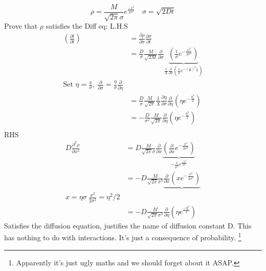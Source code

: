 \documentclass[11pt]{book}
\theoremstyle{definition}
\begin{document}
\[ \rho = \frac{M}{\sqrt{2\pi} \sigma} e^{\frac{-x^2}{2\sigma^2}} \quad \sigma = \sqrt{2Dt} \]
Prove that $ \rho $ satisfies the Diff eq: L.H.S
\[
\begin{aligned}	
	\left( \frac{\partial t}{\partial t} \right) &= \frac{\partial \rho}{\partial \sigma} \frac{\partial \sigma}{\partial t} \\
	&= \frac{D}{\sigma} \frac{M}{\sqrt{2M}}\frac{\partial }{\partial \sigma}
	\underbrace{\left( \frac{1}{\sigma} e^{-\frac{x^2}{2\sigma^2}} \right)}_{\frac{1}{X}\frac{\partial }{\partial \sigma} \left( \frac{x}{\sigma} e^{-(\frac{x}{\sigma})^2 \frac{1}{2}} \right) } \\
	\text{Set } \eta = \frac{x}{\sigma}, \: \frac{\partial }{\partial \sigma} = \frac{\eta}{\sigma} \frac{\partial }{\partial \eta} \\
	&= \frac{D}{\sigma} \frac{M}{\sqrt{2\pi}} \frac{1}{X} \frac{\partial \eta}{\partial \sigma} \frac{\partial }{\partial \eta} \left( \eta e^{-\frac{\eta^2}{2}} \right) \\
	&= -\frac{D}{\sigma^2} \frac{M}{\sqrt{2\pi}}\frac{\partial }{\partial \eta} \left( \eta e^{-\frac{\eta^2}{2}} \right) \\
\end{aligned}
\]
RHS
\[ 
\begin{aligned}
	D \frac{\partial ^2\rho}{\partial x^2} &= D \frac{M}{\sqrt{2\pi}\sigma} \frac{\partial }{\partial x}
	\underbrace{\left( \frac{\partial }{\partial x} e^{-\frac{x^2}{2\sigma^2}} \right)}_{-\frac{x}{\sigma^2} e^{\frac{-x^2}{2\sigma^2}}}  \\
	&= -D \frac{M}{\sqrt{2\pi}\sigma^3} 
	\underbrace{\frac{\partial }{\partial x} \left( x e^{-\frac{x^2}{2\sigma^2}} \right)  } \\
	x = \eta \sigma \: \frac{x^2}{2\sigma^2} = \eta^2/2 \\
	  &= -D \frac{M}{\sqrt{2\pi}\sigma^3} \frac{\partial }{\partial \eta} (\eta e^{\frac{-\eta^2}{2}})
\end{aligned}
\]
Satisfies the diffusion equation, justifies the name of diffusion constant D.
This has nothing to do with interactions. It's just a consequence of probability.
\footnote{Apparently it's just ugly maths and we should forget about it ASAP.}
\end{document}
